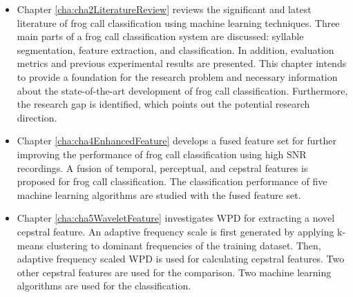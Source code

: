 \begin{itemize}

\item Chapter \ref{cha:cha2LiteratureReview} reviews the significant and latest literature of frog call classification using machine learning techniques. Three main parts of a frog call classification system are discussed: syllable segmentation, feature extraction, and classification. 
In addition, evaluation metrics and previous experimental results are presented. This chapter intends to provide a foundation for the research problem and necessary information about the state-of-the-art development of frog call classification. Furthermore, the research gap is identified, which points out the potential research direction.


\item Chapter \ref{cha:cha4EnhancedFeature} develops a fused feature set for further improving the performance of frog call classification using high SNR recordings. A fusion of temporal, perceptual, and cepstral features is proposed for frog call classification. The classification performance of five machine learning algorithms are studied with the fused feature set. 



\item  Chapter \ref{cha:cha5WaveletFeature} investigates WPD for extracting a novel cepstral feature. An adaptive frequency scale is first generated by applying k-means clustering to dominant frequencies of the training dataset.
Then, adaptive frequency scaled WPD is used for calculating cepstral features. Two other cepstral features are used for the comparison. Two machine learning algorithms are used for the classification.



\end{itemize}

